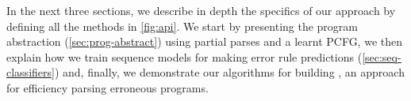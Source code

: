 In the next three sections, we describe in depth the specifics of our approach
by defining all the methods in \autoref{fig:api}. We start by presenting the
program abstraction (\autoref{sec:prog-abstract}) using partial parses and a
learnt PCFG, we then explain how we train sequence models for making error rule
predictions (\autoref{sec:seq-classifiers}) and, finally, we demonstrate our
algorithms for building \toolname, an approach for efficiency parsing erroneous
programs.
